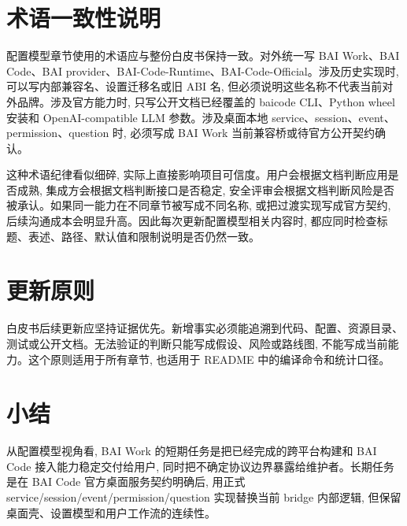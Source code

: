 \section{术语一致性说明}
配置模型章节使用的术语应与整份白皮书保持一致。对外统一写 BAI Work、BAI Code、BAI provider、BAI-Code-Runtime、BAI-Code-Official。涉及历史实现时, 可以写内部兼容名、设置迁移名或旧 ABI 名, 但必须说明这些名称不代表当前对外品牌。涉及官方能力时, 只写公开文档已经覆盖的 baicode CLI、Python wheel 安装和 OpenAI-compatible LLM 参数。涉及桌面本地 service、session、event、permission、question 时, 必须写成 BAI Work 当前兼容桥或待官方公开契约确认。

这种术语纪律看似细碎, 实际上直接影响项目可信度。用户会根据文档判断应用是否成熟, 集成方会根据文档判断接口是否稳定, 安全评审会根据文档判断风险是否被承认。如果同一能力在不同章节被写成不同名称, 或把过渡实现写成官方契约, 后续沟通成本会明显升高。因此每次更新配置模型相关内容时, 都应同时检查标题、表述、路径、默认值和限制说明是否仍然一致。

\section{更新原则}
白皮书后续更新应坚持证据优先。新增事实必须能追溯到代码、配置、资源目录、测试或公开文档。无法验证的判断只能写成假设、风险或路线图, 不能写成当前能力。这个原则适用于所有章节, 也适用于 README 中的编译命令和统计口径。

\section{小结}
从配置模型视角看, BAI Work 的短期任务是把已经完成的跨平台构建和 BAI Code 接入能力稳定交付给用户, 同时把不确定协议边界暴露给维护者。长期任务是在 BAI Code 官方桌面服务契约明确后, 用正式 service/session/event/permission/question 实现替换当前 bridge 内部逻辑, 但保留桌面壳、设置模型和用户工作流的连续性。
